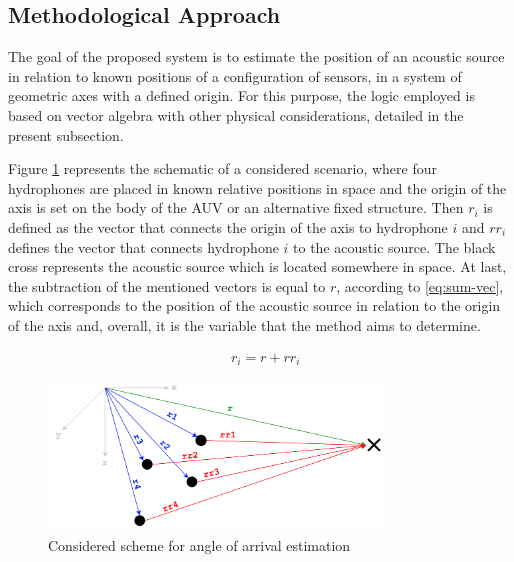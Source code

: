 

\subsection{Methodological Approach} \label{subsec:estimator}

The goal of the proposed system is to estimate the position of an acoustic source in relation to known positions of a configuration of sensors, in a system of geometric axes with a defined origin. For this purpose, the logic employed is based on vector algebra with other physical considerations, detailed in the present subsection. 

Figure \ref{fig:AoA-init} represents the schematic of a considered scenario, where four hydrophones are placed in known relative positions in space and the origin of the axis is set on the body of the AUV or an alternative fixed structure. Then $r_i$ is defined as the vector that connects the origin of the axis to hydrophone $i$ and $rr_i$ defines the vector that connects hydrophone $i$ to the acoustic source. The black cross represents the acoustic source which is located somewhere in space. At last, the subtraction of the mentioned vectors is equal to $r$, according to \ref{eq:sum-vec}, which corresponds to the position of the acoustic source in relation to the origin of the axis and, overall, it is the variable that the method aims to determine.

\begin{eqnarray}
& r_i = r + rr_i
\label{eq:sum-vec}
\end{eqnarray}

\begin{figure}[!htbp]
	\centering
	\includegraphics[width=0.8\textwidth]{figures/AoA-init}
	\captionsetup{justification=centering,margin=2cm}
	\caption{Considered scheme for angle of arrival estimation}
	\label{fig:AoA-init}
\end{figure}

